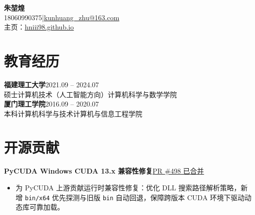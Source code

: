 \documentclass[UTF8,10pt,a4paper,fontset=none]{ctexart}
\newcommand{\lk}[2]{\href{#1}{\underline{#2}}}
\begin{document}
\begin{center}
{\sffamily\bfseries\fontsize{25}{30}\selectfont 朱堃煌}\\[5pt]
18060990375\quad |\quad \href{mailto:kunhuang_zhu@163.com}{kunhuang\_zhu@163.com}\\[3pt]
主页：\lk{https://hniii98.github.io/}{hniii98.github.io}
\end{center}
\vspace{-6pt}
\section{教育经历}
\textbf{福建理工大学}\hfill 2021.09 -- 2024.07\\
硕士\quad 计算机技术（人工智能方向）\quad 计算机科学与数学学院\\[3pt]
\textbf{厦门理工学院}\hfill 2016.09 -- 2020.07\\
本科\quad 计算机科学与技术\quad 计算机与信息工程学院
\section{开源贡献}
\textbf{PyCUDA Windows CUDA 13.x 兼容性修复}\hfill \lk{https://github.com/inducer/pycuda/pull/498}{PR \#498 已合并}
\begin{itemize}
\item 为 PyCUDA 上游贡献运行时兼容性修复：优化 DLL 搜索路径解析策略，新增 \texttt{bin/x64} 优先探测与旧版 \texttt{bin} 自动回退，保障跨版本 CUDA 环境下驱动动态库可靠加载。
\end{itemize}
\end{document}
